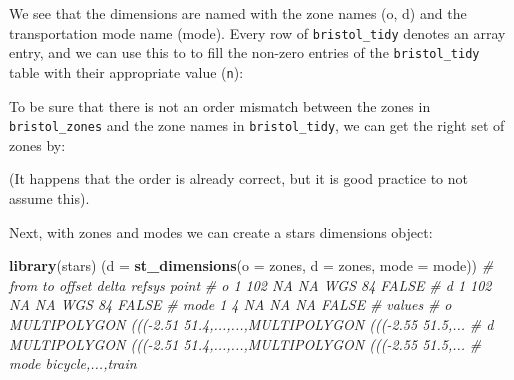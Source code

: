 \documentclass[]{book}
\newenvironment{Shaded}{\begin{snugshade}}{\end{snugshade}}
\newcommand{\CommentTok}[1]{\textcolor[rgb]{0.56,0.35,0.01}{\textit{#1}}}
\newcommand{\DataTypeTok}[1]{\textcolor[rgb]{0.13,0.29,0.53}{#1}}
\newcommand{\KeywordTok}[1]{\textcolor[rgb]{0.13,0.29,0.53}{\textbf{#1}}}
\newcommand{\NormalTok}[1]{#1}
\newcommand{\OperatorTok}[1]{\textcolor[rgb]{0.81,0.36,0.00}{\textbf{#1}}}
\newcommand{\StringTok}[1]{\textcolor[rgb]{0.31,0.60,0.02}{#1}}
\begin{document}
We see that the dimensions are named with the zone names (o, d)
and the transportation mode name (mode).
Every row of \texttt{bristol\_tidy} denotes an array entry, and we can
use this to to fill the non-zero entries of the \texttt{bristol\_tidy} table
with their appropriate value (\texttt{n}):

\begin{Shaded}
\end{Shaded}

To be sure that there is not an order mismatch between the zones
in \texttt{bristol\_zones} and the zone names in \texttt{bristol\_tidy}, we can
get the right set of zones by:

\begin{Shaded}
\end{Shaded}

(It happens that the order is already correct, but it is good
practice to not assume this).

Next, with zones and modes we can create a stars dimensions object:

\begin{Shaded}
\begin{Highlighting}[]
\KeywordTok{library}\NormalTok{(stars)}
\NormalTok{(}\DataTypeTok{d =} \KeywordTok{st_dimensions}\NormalTok{(}\DataTypeTok{o =}\NormalTok{ zones, }\DataTypeTok{d =}\NormalTok{ zones, }\DataTypeTok{mode =}\NormalTok{ mode))}
\CommentTok{#      from  to offset delta refsys point}
\CommentTok{# o       1 102     NA    NA WGS 84 FALSE}
\CommentTok{# d       1 102     NA    NA WGS 84 FALSE}
\CommentTok{# mode    1   4     NA    NA     NA FALSE}
\CommentTok{#                                                                 values}
\CommentTok{# o    MULTIPOLYGON (((-2.51 51.4,...,...,MULTIPOLYGON (((-2.55 51.5,...}
\CommentTok{# d    MULTIPOLYGON (((-2.51 51.4,...,...,MULTIPOLYGON (((-2.55 51.5,...}
\CommentTok{# mode                                                 bicycle,...,train}
\end{Highlighting}
\end{Shaded}
\end{document}
